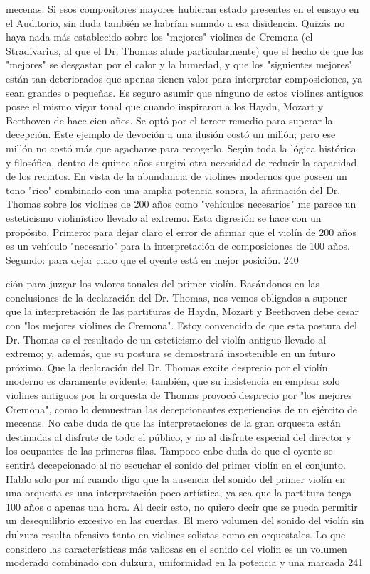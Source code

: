 mecenas. Si esos compositores mayores hubieran estado presentes en el ensayo en el Auditorio, sin duda también se habrían sumado a esa disidencia.
Quizás no haya nada más establecido sobre los "mejores" violines de Cremona (el Stradivarius, al que el Dr. Thomas alude particularmente) que el hecho de que los "mejores" se desgastan por el calor y la humedad, y que los "siguientes mejores" están tan deteriorados que apenas tienen valor para interpretar composiciones, ya sean grandes o pequeñas. Es seguro asumir que ninguno de estos violines antiguos posee el mismo vigor tonal que cuando inspiraron a los Haydn, Mozart y Beethoven de hace cien años.
Se optó por el tercer remedio para superar la decepción. Este ejemplo de devoción a una ilusión costó un millón; pero ese millón no costó más que agacharse para recogerlo. Según toda la lógica histórica y filosófica, dentro de quince años surgirá otra necesidad de reducir la capacidad de los recintos.
En vista de la abundancia de violines modernos que poseen un tono "rico" combinado con una amplia potencia sonora, la afirmación del Dr. Thomas sobre los violines de 200 años como "vehículos necesarios" me parece un esteticismo violinístico llevado al extremo.
Esta digresión se hace con un propósito. Primero: para dejar claro el error de afirmar que el violín de 200 años es un vehículo "necesario" para la interpretación de composiciones de 100 años. Segundo: para dejar claro que el oyente está en mejor posición.
240

ción para juzgar los valores tonales del primer violín. Basándonos en las conclusiones de la declaración del Dr. Thomas, nos vemos obligados a suponer que la interpretación de las partituras de Haydn, Mozart y Beethoven debe cesar con "los mejores violines de Cremona". Estoy convencido de que esta postura del Dr. Thomas es el resultado de un esteticismo del violín antiguo llevado al extremo; y, además, que su postura se demostrará insostenible en un futuro próximo. Que la declaración del Dr. Thomas excite desprecio por el violín moderno es claramente evidente; también, que su insistencia en emplear solo violines antiguos por la orquesta de Thomas provocó desprecio por "los mejores Cremona", como lo demuestran las decepcionantes experiencias de un ejército de mecenas. No cabe duda de que las interpretaciones de la gran orquesta están destinadas al disfrute de todo el público, y no al disfrute especial del director y los ocupantes de las primeras filas. Tampoco cabe duda de que el oyente se sentirá decepcionado al no escuchar el sonido del primer violín en el conjunto. Hablo solo por mí cuando digo que la ausencia del sonido del primer violín en una orquesta es una interpretación poco artística, ya sea que la partitura tenga 100 años o apenas una hora. Al decir esto, no quiero decir que se pueda permitir un desequilibrio excesivo en las cuerdas. El mero volumen del sonido del violín sin dulzura resulta ofensivo tanto en violines solistas como en orquestales. Lo que considero las características más valiosas en el sonido del violín es un volumen moderado combinado con dulzura, uniformidad en la potencia y una marcada
241

